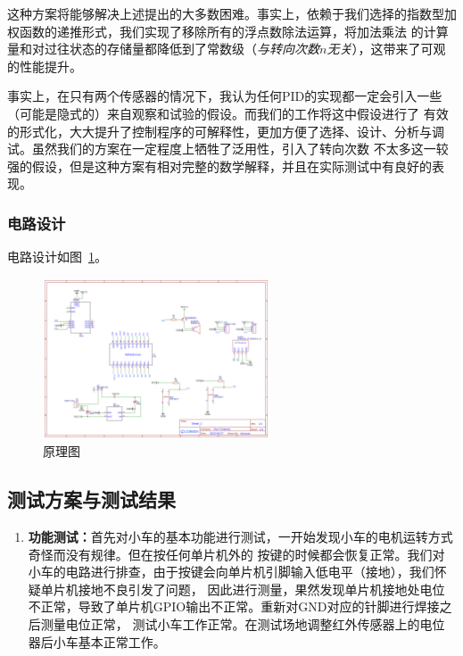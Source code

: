 \documentclass[a4paper,twoside,zihao=5,UTF8]{ctexart}
\begin{document}
\begin{spacing}{1.2}
这种方案将能够解决上述提出的大多数困难。事实上，依赖于我们选择的指数型加权函数的递推形式，我们实现了移除所有的浮点数除法运算，将加法乘法
的计算量和对过往状态的存储量都降低到了常数级（\emph{与转向次数$n$无关}），这带来了可观的性能提升。

事实上，在只有两个传感器的情况下，我认为任何PID的实现都一定会引入一些（可能是隐式的）来自观察和试验的假设。而我们的工作将这中假设进行了
有效的形式化，大大提升了控制程序的可解释性，更加方便了选择、设计、分析与调试。虽然我们的方案在一定程度上牺牲了泛用性，引入了转向次数
不太多这一较强的假设，但是这种方案有相对完整的数学解释，并且在实际测试中有良好的表现。

\subsubsection{电路设计}

电路设计如图~\ref{fig:schematic2}。

\begin{figure}[H]
	\centering
	\caption{原理图}
	\label{fig:schematic2}
	\includegraphics[width=0.6\textwidth]{Schematic.png}
\end{figure}


\subsection{测试方案与测试结果}

\begin{enumerate}
	\item \textbf{功能测试：}首先对小车的基本功能进行测试，一开始发现小车的电机运转方式奇怪而没有规律。但在按任何单片机外的
	按键的时候都会恢复正常。我们对小车的电路进行排查，由于按键会向单片机引脚输入低电平（接地），我们怀疑单片机接地不良引发了问题，
	因此进行测量，果然发现单片机接地处电位不正常，导致了单片机GPIO输出不正常。重新对GND对应的针脚进行焊接之后测量电位正常，
	测试小车工作正常。在测试场地调整红外传感器上的电位器后小车基本正常工作。


\end{enumerate}
\end{spacing}
\end{document}
